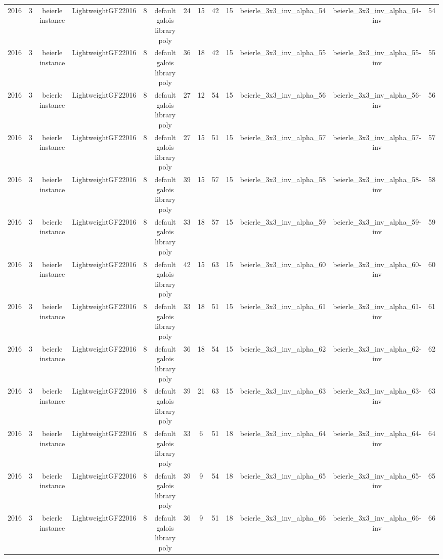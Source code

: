 \begin{tabular}{c c c c c c c c c c c c c}
2016 & 3 & beierle instance & LightweightGF22016 & 8 & default galois library poly & 24 & 15 & 42 & 15 & beierle_3x3_inv_alpha_54 & beierle_3x3_inv_alpha_54-inv & 54 \\
2016 & 3 & beierle instance & LightweightGF22016 & 8 & default galois library poly & 36 & 18 & 42 & 15 & beierle_3x3_inv_alpha_55 & beierle_3x3_inv_alpha_55-inv & 55 \\
2016 & 3 & beierle instance & LightweightGF22016 & 8 & default galois library poly & 27 & 12 & 54 & 15 & beierle_3x3_inv_alpha_56 & beierle_3x3_inv_alpha_56-inv & 56 \\
2016 & 3 & beierle instance & LightweightGF22016 & 8 & default galois library poly & 27 & 15 & 51 & 15 & beierle_3x3_inv_alpha_57 & beierle_3x3_inv_alpha_57-inv & 57 \\
2016 & 3 & beierle instance & LightweightGF22016 & 8 & default galois library poly & 39 & 15 & 57 & 15 & beierle_3x3_inv_alpha_58 & beierle_3x3_inv_alpha_58-inv & 58 \\
2016 & 3 & beierle instance & LightweightGF22016 & 8 & default galois library poly & 33 & 18 & 57 & 15 & beierle_3x3_inv_alpha_59 & beierle_3x3_inv_alpha_59-inv & 59 \\
2016 & 3 & beierle instance & LightweightGF22016 & 8 & default galois library poly & 42 & 15 & 63 & 15 & beierle_3x3_inv_alpha_60 & beierle_3x3_inv_alpha_60-inv & 60 \\
2016 & 3 & beierle instance & LightweightGF22016 & 8 & default galois library poly & 33 & 18 & 51 & 15 & beierle_3x3_inv_alpha_61 & beierle_3x3_inv_alpha_61-inv & 61 \\
2016 & 3 & beierle instance & LightweightGF22016 & 8 & default galois library poly & 36 & 18 & 54 & 15 & beierle_3x3_inv_alpha_62 & beierle_3x3_inv_alpha_62-inv & 62 \\
2016 & 3 & beierle instance & LightweightGF22016 & 8 & default galois library poly & 39 & 21 & 63 & 15 & beierle_3x3_inv_alpha_63 & beierle_3x3_inv_alpha_63-inv & 63 \\
2016 & 3 & beierle instance & LightweightGF22016 & 8 & default galois library poly & 33 & 6 & 51 & 18 & beierle_3x3_inv_alpha_64 & beierle_3x3_inv_alpha_64-inv & 64 \\
2016 & 3 & beierle instance & LightweightGF22016 & 8 & default galois library poly & 39 & 9 & 54 & 18 & beierle_3x3_inv_alpha_65 & beierle_3x3_inv_alpha_65-inv & 65 \\
2016 & 3 & beierle instance & LightweightGF22016 & 8 & default galois library poly & 36 & 9 & 51 & 18 & beierle_3x3_inv_alpha_66 & beierle_3x3_inv_alpha_66-inv & 66 \\

\end{tabular}
